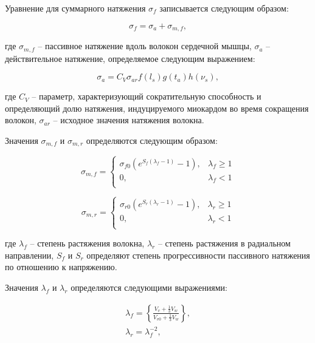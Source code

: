 Уравнение для суммарного натяжения $\sigma_f$ записывается следующим образом:

\begin{equation}
	\sigma_f = \sigma_a + \sigma_{m,f},
\end{equation}

\noindent где $\sigma_{m,f}$ -- пассивное натяжение вдоль волокон сердечной мышцы, $\sigma_a$ -- действительное натяжение, определяемое следующим выражением:

\begin{equation}
	\sigma_a = C_V \sigma_{ar} f(l_s) g(t_a) h(\nu_s),
\end{equation}

\noindent где $C_V$ -- параметр, характеризующий сократительную способность и определяющий долю натяжения, индуцируемого миокардом во время сокращения волокон, $\sigma_{ar}$ -- исходное значения натяжения волокна. 

Значения $\sigma_{m,f}$ и $\sigma_{m,r}$ определяются следующим образом:

\begin{equation}
	\sigma_{m,f} = \begin{cases} \sigma_{f0} \left(e^{S_f (\lambda_f -1)} -1 \right), &\lambda_f \geq 1 \\ 0, &\lambda_f < 1 \\ \end{cases}
\end{equation}

\begin{equation}
	\sigma_{m,r} = \begin{cases} \sigma_{r0} \left(e^{S_r (\lambda_r -1)} -1 \right), &\lambda_r \geq 1 \\ 0, &\lambda_r < 1 \\ \end{cases}
\end{equation}

\noindent где $\lambda_f$ -- степень растяжения волокна, $\lambda_r$ -- степень растяжения в радиальном направлении, $S_f$ и $S_r$ определяют степень прогрессивности пассивного натяжения по отношению к напряжению.

Значения $\lambda_f$ и $\lambda_r$ определяются следующими выражениями:

\begin{gather*}
  \lambda_f = \left\{\frac{V_v + \frac{1}{3} V_w}{V_{v0} + \frac{1}{3} V_w} \right\}, \\
  \lambda_r = \lambda_f ^{-2},
\end{gather*}

